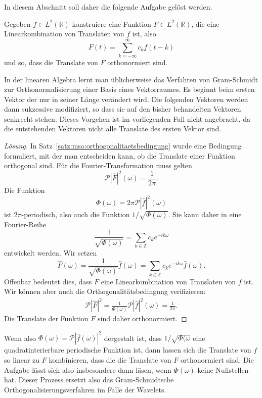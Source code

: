 

In diesem Abschnitt soll daher die folgende Aufgabe gelöst werden.
\begin{aufgabe}
\label{aufgabe:orthonormalisierung}
Gegeben $f\in L^2(\mathbb R)$ konstruiere eine Funktion 
$F\in L^2(\mathbb R)$, die eine Linearkombination von 
Translaten von $f$ ist, also
\[
F(t) = \sum_{k=-\infty}^\infty c_k f(t-k)
\]
und so, dass die Translate von $F$ orthonormiert sind.
\end{aufgabe}

In der linearen Algebra lernt man üblicherweise das Verfahren von
Gram-Schmidt zur Orthonormalisierung einer Basis eines Vektorraumes.
Es beginnt beim ersten Vektor der nur in seiner Länge verändert wird.
Die folgenden Vektoren werden dann sukzessive modifiziert, so dass sie
auf den bisher behandelten Vektoren senkrecht stehen.
Dieses Vorgehen ist im vorliegenden Fall nicht angebracht, da die
entstehenden Vektoren nicht alle Translate des ersten Vektor sind.

\begin{proof}[Lösung]
In Satz~\ref{satz:msa:orthogonalitaetsbedingung} wurde eine Bedingung
formuliert, mit der man entscheiden kann, ob die Translate einer 
Funktion orthogonal sind.
Für die Fourier-Transformation muss gelten
\[
\mathcal{P}|\hat{F}|^2(\omega)
=
\frac{1}{2\pi}.
\]
Die Funktion 
\[
\Phi(\omega)
=
2\pi\mathcal{P}|\hat{f}|^2(\omega)
\]
ist $2\pi$-periodisch, also auch die Funktion $1/\sqrt{\Phi(\omega)}$.
Sie kann daher in eine Fourier-Reihe
\[
\frac{1}{\sqrt{\Phi(\omega)}}
=
\sum_{k\in\mathbb Z} c_ke^{-ik\omega}
\]
entwickelt werden.
Wir setzen 
\[
\hat{F}(\omega)
=
\frac{1}{\sqrt{\Phi(\omega)}} 
\hat{f}(\omega)
=
\sum_{k\in\mathbb Z} c_ke^{-ik\omega}\hat{f}(\omega).
\]
Offenbar bedeutet dies, dass $F$ eine Linearkombination von Translaten
von $f$ ist.
Wir können aber auch die Orthogonalitätsbedingung verifizieren:
\begin{align*}
\mathcal{P}|\hat{F}|^2
=
\frac{1}{\Phi(\omega)} \mathcal{P}|\hat{f}|^2(\omega)
=
\frac{1}{2\pi}.
\end{align*}
Die Translate der Funktion $F$ sind daher orthonormiert.
\end{proof}

Wenn also
$\Phi(\omega)=\mathcal{P}|\hat{f}(\omega)|^2$ dergestalt ist, dass 
$1/\sqrt{\Phi(\omega}$ eine quadratinterierbare periodische Funktion ist,
dann lassen sich die Translate von $f$ so linear zu $F$ kombinieren, dass die
die Translate von $F$ orthonormiert sind.
Die Aufgabe lässt sich also insbesondere dann läsen, wenn $\Phi(\omega)$
keine Nullstellen hat.
Dieser Prozess ersetzt also das Gram-Schmidtsche Orthogonalisierungsverfahren
im Falle der Wavelets.





